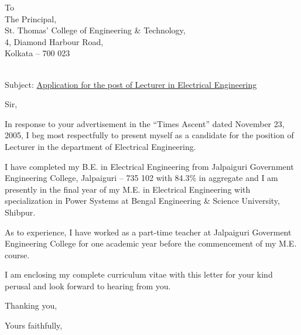 \documentclass[a4paper,11pt]{letter}
\date{\today}
\begin{document}
\begin{letter}	
{To\\
The Principal,\\
St. Thomas' College of Engineering \& Technology,\\
4, Diamond Harbour Road,\\
Kolkata -- 700 023\\
\vspace{24pt}\\
\begin{center}
Subject: \underline{Application for the post of Lecturer in Electrical Engineering}
\end{center}
}

\opening{Sir,}

In response to your advertisement in the ``Times Ascent'' dated November 23, 2005, I beg most respectfully to present myself as a candidate for the position of Lecturer in the department of Electrical Engineering.

I have completed my B.E. in Electrical Engineering from Jalpaiguri Government Engineering College, Jalpaiguri -- 735 102 with 84.3\% in aggregate and I am presently in the final year of my M.E. in Electrical Engineering with specialization in Power Systems at Bengal Engineering \& Science University, Shibpur.

As to experience, I have worked as a part-time teacher at Jalpaiguri Goverment Engineering College for one academic year before the commencement of my M.E. course.

I am enclosing my complete curriculum vitae with this letter for your kind perusal and look forward to hearing from you.

Thanking you,

\closing{Yours faithfully,}

\end{letter}
\end{document}
